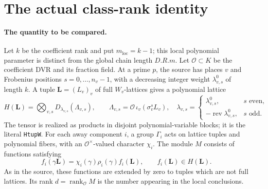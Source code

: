 \section{The actual class-rank identity}
\label{sec:class-rank}


\paragraph{The quantity to be compared.}
Let $k$ be the coefficient rank and put $m_{\mathrm{loc}}=k-1$;
this local polynomial parameter is distinct from the global chain
length $D.R.m$. Let $\mathcal O\subset K$ be the coefficient DVR and
its fraction field. At a prime $p$, the source has places $v$ and
Frobenius positions $s=0,\ldots,n_v-1$, with a decreasing integer
weight $\lambda^0_{v,s}$ of length $k$. A tuple $\mathbf L=(L_v)_v$
of full $W_v$-lattices gives a polynomial lattice
\[
 H(\mathbf L)=\bigotimes_{v,s}
       D_{\lambda_{v,s}}(\Lambda_{v,s}),\qquad
 \Lambda_{v,s}=\mathcal O\,\iota_v(\sigma_v^s L_v),
 \quad
 \lambda_{v,s}=
 \begin{cases}
 \lambda^0_{v,s},&s\text{ even},\\
 -\operatorname{rev}\lambda^0_{v,s},&s\text{ odd}.
 \end{cases}                                                    \tag{CR.1}
\]
The tensor is realized as products in disjoint polynomial-variable
blocks; it is the literal \texttt{HtupW}.
For each away component $i$, a group $\Gamma_i$ acts on lattice tuples
and polynomial fibers, with an $\mathcal O^{\times}$-valued character
$\chi_i$. The module $M$ consists of functions satisfying
\[
 f_i(\gamma\mathbf L)=\chi_i(\gamma)\rho_i(\gamma)f_i(\mathbf L),
 \qquad f_i(\mathbf L)\in H(\mathbf L).
                                                               \tag{CR.2}
\]
As in the source, these functions are extended by zero to tuples which
are not full lattices. Its rank $d=\operatorname{rank}_{\mathcal O}M$
is the number appearing in the local conclusions.

